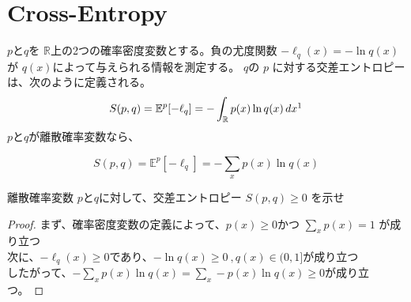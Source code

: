 \documentclass[a4paper]{jsarticle}%
\begin{document}
\maketitle
\vspace{-0.4cm}
\begin{figure}[H] 
  \centering
  \label{fig:my_label}
\end{figure}
\section{\textbf{Cross-Entropy}}
\thispagestyle{plain}
\begin{dfn}\label{def:cross-entropy}
$p$と$q$を $ \mathbb{R} $上の2つの確率密度変数とする。負の尤度関数 $ -\ell_{q}(x)=-\ln q(x) $が $ q(x) $によって与えられる情報を測定する。
$q $の $ p $ に対する交差エントロピーは、次のように定義される。\\
\begin{equation}
  S(p, q) = \mathbb{E}^p[-\ell_q] = -\int_{\mathbb{R}} p(x) \ln q(x) \, dx\footnotemark[1] \label{eq2}
\end{equation}
$p$と$q$が離散確率変数なら、

\begin{equation}
  S(p, q) = \mathbb{E}^p[-\ell_q] = -\sum_{x} p(x) \ln q(x)
\end{equation}


\begin{exercise}
  離散確率変数 $p$と$q$に対して、交差エントロピー $S(p, q)\geq 0$ を示せ\\
\end{exercise}

\begin{proof}
まず、確率密度変数の定義によって、$p(x)\geq 0$かつ $ \displaystyle\sum_{x}p(x)=1 $  が成り立つ\\  
次に、$-\ell_{q}(x)\geq 0$であり、\ie $ -\ln q(x)\geq 0 \ ,q(x)\in (0,1]$が成り立つ\\
したがって、$-\sum_{x} p(x) \ln q(x) = \sum_{x} -p(x) \ln q(x)\geq 0$が成り立つ。
\end{proof}
\end{dfn}
\end{document}
